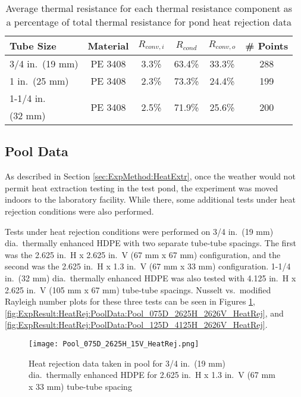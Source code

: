 	\begin{table}[h]
		\centering
		\caption[Average thermal resistance percentages for pond heat rejection data]{Average thermal resistance for each thermal resistance component as a percentage of total thermal resistance for pond heat rejection data}
		\label{tab:ExpResult:PondHeatRej:ThermalPercentage}
		\begin{tabular}{p{3cm} c c c c c}
		\hline
		Tube Size & Material & $R_{conv,i}$ & $R_{cond}$ & $R_{conv,o}$ & \# Points\\
		\hline\hline
		3/4 in.\ (19 mm) & PE 3408 & 3.3\% & 63.4\% & 33.3\% & 288\\
		\hline
		1 in.\ (25 mm) & PE 3408 & 2.3\% & 73.3\% & 24.4\% & 199\\
		\hline
		1-1/4 in.\ & \multirow{2}{*}{PE 3408} & \multirow{2}{*}{2.5\%} & \multirow{2}{*}{71.9\%} & \multirow{2}{*}{25.6\%} & \multirow{2}{*}{200} \\
		(32 mm) & & & & \\
		\hline		
		\end{tabular}
	\end{table}

	\subsection{Pool Data}
	\label{subsec:ExpResult:HeatRej:PoolData}

As described in Section \ref{sec:ExpMethod:HeatExtr}, once the weather would not permit heat extraction testing in the test pond, the experiment was moved indoors to the laboratory facility. While there, some additional tests under heat rejection conditions were also performed.

Tests under heat rejection conditions were performed on 3/4 in.\ (19 mm) dia.\ thermally enhanced HDPE with two separate tube-tube spacings. The first was the 2.625 in.\ H x 2.625 in.\ V (67 mm x 67 mm) configuration, and the second was the 2.625 in.\ H x 1.3 in.\ V (67 mm x 33 mm) configuration. 1-1/4 in.\ (32 mm) dia.\ thermally enhanced HDPE was also tested with 4.125 in.\ H x 2.625 in.\ V (105 mm x 67 mm) tube-tube spacings. Nusselt vs.\ modified Rayleigh number plots for these three tests can be seen in Figures \ref{fig:ExpResult:HeatRej:PoolData:Pool_075D_2625H_15V_HeatRej}, \ref{fig:ExpResult:HeatRej:PoolData:Pool_075D_2625H_2626V_HeatRej}, and \ref{fig:ExpResult:HeatRej:PoolData:Pool_125D_4125H_2626V_HeatRej}.

	\begin{figure}
		\centering
		\texttt{[image: Pool\_075D\_2625H\_15V\_HeatRej.png]}
		\caption[Heat rejection data taken in pool on June 30, 2012]{Heat rejection data taken in pool for 3/4 in.\ (19 mm) dia.\ thermally enhanced HDPE for 2.625 in.\ H x 1.3 in.\ V (67 mm x 33 mm) tube-tube spacing}
		\label{fig:ExpResult:HeatRej:PoolData:Pool_075D_2625H_15V_HeatRej}
	\end{figure}	
	
